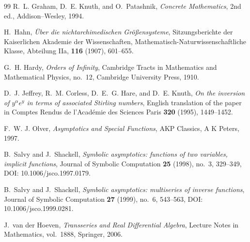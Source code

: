 \documentclass[11pt]{article}
\theoremstyle{pltheorem}
\begin{document}
\begin{thebibliography}{99}
R.~L. Graham, D.~E. Knuth, and O.~Patashnik,
\emph{Concrete Mathematics}, 2nd ed., Addison--Wesley, 1994.

H.~Hahn,
\emph{\"Uber die nichtarchimedischen Gr\"o{\ss}ensysteme},
Sitzungsberichte der Kaiserlichen Akademie der Wissenschaften,
Mathematisch-Naturwissenschaftliche Klasse, Abteilung IIa,
\textbf{116} (1907), 601--655.

G.~H. Hardy,
\emph{Orders of Infinity},
Cambridge Tracts in Mathematics and Mathematical Physics, no.~12,
Cambridge University Press, 1910.

D.~J. Jeffrey, R.~M. Corless, D.~E.~G. Hare, and D.~E. Knuth,
\emph{On the inversion of \(y^\alpha e^y\) in terms of associated Stirling numbers},
English translation of the paper in Comptes Rendus de l'Acad\'emie des Sciences Paris
\textbf{320} (1995), 1449--1452.

F.~W. J. Olver,
\emph{Asymptotics and Special Functions},
AKP Classics, A K Peters, 1997.

B.~Salvy and J.~Shackell,
\emph{Symbolic asymptotics: functions of two variables, implicit functions},
Journal of Symbolic Computation \textbf{25} (1998), no.~3, 329--349,
DOI: 10.1006/jsco.1997.0179.

B.~Salvy and J.~Shackell,
\emph{Symbolic asymptotics: multiseries of inverse functions},
Journal of Symbolic Computation \textbf{27} (1999), no.~6, 543--563,
DOI: 10.1006/jsco.1999.0281.

J.~van der Hoeven,
\emph{Transseries and Real Differential Algebra},
Lecture Notes in Mathematics, vol.~1888, Springer, 2006.

\end{thebibliography}
\end{document}
